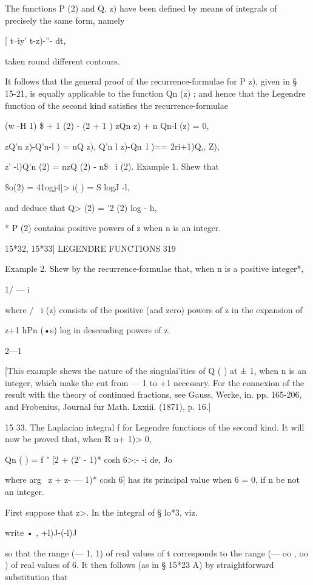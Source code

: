 {{The functions P (2) and Q, z) have been defined by means of integrals
of precisely the same form, namely

[ t--iy' t-z)-''- dt,

taken round different contours.

It follows that the general proof of the recurrence-formulae for P z),
given in § 15-21, is equally applicable to the function Qn (z) ; and
hence that the Legendre function of the second kind satisfies the
recurrence-formulae

(w -H 1) \$ + 1 (2) - (2 + 1 ) zQn z) + n Qn-l (z) = 0,

zQ'n z)-Q'n-l ) = nQ z), Q'n l z)-Qn~l )== 2ri+1)Q,, Z),

 z' -l)Q'n (2) = nzQ (2) - n\$ \ i (2). Example 1. Shew that

\$o(2) = 41ogj4|> i( ) = S logJ -l,

and deduce that Q> (2) = '2 (2) log - h,

* P (2) contains positive powers of z when n is an integer.

15*32, 15*33] LEGENDRE FUNCTIONS 319

Example 2. Shew by the recurrence-formulae that, when n is a positive
integer*,

 1/ — i

where / \ i (z) consists of the positive (and zero) powers of z in the
expansion of

z+1 hPn (•s) log in descending powers of z.

2—1

[This example shews the nature of the singulai'ities of Q ( ) at ± 1,
when n is an integer, which make the cut from — 1 to +1 necessary. For
the connexion of the result with the theory of continued fractions,
see Gauss, Werke, in. pp. 165-206, and Frobenius, Journal fur Math.
Lxxiii. (1871), p. 16.]

15 33. The Laplacian integral f for Legendre functions of the second
kind. It will now be proved that, when R n+ 1)> 0,

Qn ( ) = f " [2 + (2' - 1)* cosh 6>;- -i de, Jo

where arg \ z + z- — 1)* cosh 6] has its principal value when 6 = 0,
if n be not an integer.

First suppose that z>. In the integral of § lo*3, viz.

write • , +l)J-(-l)J

so that the range (— 1, 1) of real values of t corresponds to the
range (— oo , oo ) of real values of 6. It then follows (as in § 15*23
A) by straightforward substitution that

}}
